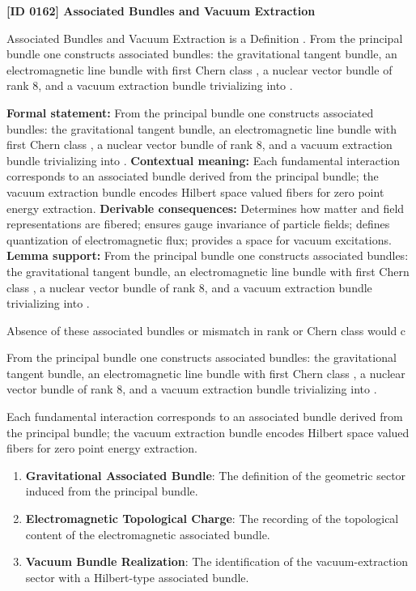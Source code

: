 \clearpage
\noindent\textbf{[ID 0162] Associated Bundles and Vacuum Extraction}\par
\vspace{0.35em}
\begingroup\small
{}
Associated Bundles and Vacuum Extraction is a Definition  . From the principal bundle one constructs associated bundles: the gravitational tangent bundle, an electromagnetic line bundle with first Chern class , a nuclear vector bundle of rank 8, and a vacuum extraction bundle trivializing into .  

\begingroup\footnotesize\setlength{\emergencystretch}{3em}\sloppy
\textbf{Formal statement:} From the principal bundle one constructs associated bundles: the gravitational tangent bundle, an electromagnetic line bundle with first Chern class , a nuclear vector bundle of rank 8, and a vacuum extraction bundle trivializing into .  
\textbf{Contextual meaning:} Each fundamental interaction corresponds to an associated bundle derived from the principal bundle; the vacuum extraction bundle encodes Hilbert space valued fibers for zero point energy extraction.  
\textbf{Derivable consequences:} Determines how matter and field representations are fibered; ensures gauge invariance of particle fields; defines quantization of electromagnetic flux; provides a space for vacuum excitations.  
\textbf{Lemma support:} From the principal bundle one constructs associated bundles: the gravitational tangent bundle, an electromagnetic line bundle with first Chern class , a nuclear vector bundle of rank 8, and a vacuum extraction bundle trivializing into .  \par
\endgroup

Absence of these associated bundles or mismatch in rank or Chern class would c

From the principal bundle one constructs associated bundles: the gravitational tangent bundle, an electromagnetic line bundle with first Chern class , a nuclear vector bundle of rank 8, and a vacuum extraction bundle trivializing into .  

Each fundamental interaction corresponds to an associated bundle derived from the principal bundle; the vacuum extraction bundle encodes Hilbert space valued fibers for zero point energy extraction.  
\endgroup

\begin{enumerate}[leftmargin=1.6em,itemsep=6pt,topsep=4pt]
\item \textbf{Gravitational Associated Bundle}: The definition of the geometric sector induced from the principal bundle.
\item \textbf{Electromagnetic Topological Charge}: The recording of the topological content of the electromagnetic associated bundle.
\item \textbf{Vacuum Bundle Realization}: The identification of the vacuum-extraction sector with a Hilbert-type associated bundle.
\end{enumerate}

